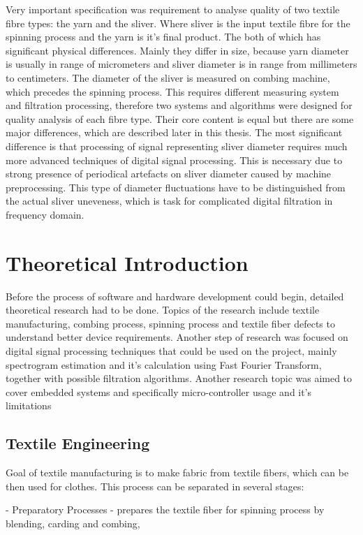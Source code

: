 \documentclass[twoside]{ctuthesis}
\theoremstyle{plain}
\theoremstyle{definition}
\theoremstyle{note}
\begin{document}
Very important specification was requirement to analyse quality of two textile fibre types: the  yarn and the sliver. Where sliver is the input textile fibre for the spinning process and the yarn is it's final product. The both of which has significant physical differences. Mainly they differ in size, because yarn diameter is usually in range of micrometers and sliver diameter is in range from millimeters to centimeters. The diameter of the sliver is measured on combing machine, which precedes the spinning process. This requires different measuring system and filtration processing, therefore two systems and algorithms were designed for quality analysis of each fibre type. Their core content is equal but there are some major differences, which are described later in this thesis. The most significant difference is that processing of signal representing sliver diameter requires much more advanced techniques of digital signal processing. This is necessary due to strong presence of periodical artefacts on sliver diameter caused by machine preprocessing. This type of diameter fluctuations have to be distinguished from the actual sliver uneveness, which is task for complicated digital filtration in frequency domain.

\chapter{Theoretical Introduction}
Before the process of software and hardware development could begin, detailed theoretical research had to be done. Topics of the research include textile manufacturing, combing process, spinning process and textile fiber defects to understand better device requirements. Another step of research was focused on digital signal processing techniques that could be used on the project, mainly spectrogram estimation and it's calculation using Fast Fourier Transform, together with possible filtration algorithms. Another research topic was aimed to cover embedded systems and specifically micro-controller usage and it's limitations
\section{Textile Engineering}
Goal of textile manufacturing is to make fabric from textile fibers, which can be then used for clothes. This process can be separated in several stages:

- Preparatory Processes - prepares the textile fiber for spinning process by blending, carding and combing,
\end{document}

